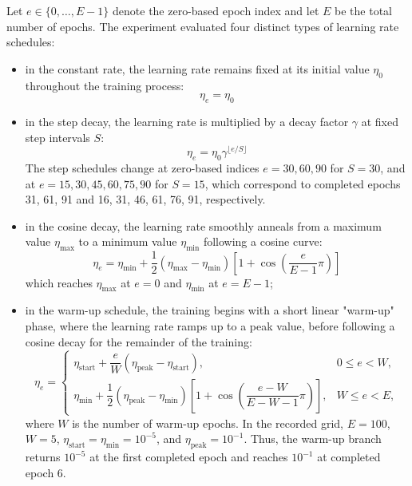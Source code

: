Let $e\in\{0,\ldots,E-1\}$ denote the zero-based epoch index and let $E$ be the total number of epochs. The experiment evaluated four distinct types of learning rate schedules:
\begin{itemize}
    \item[-] in the constant rate, the learning rate remains fixed at its initial value $\eta_0$ throughout the training process:
    \begin{equation*}
    \eta_e=\eta_0
    \end{equation*}
    \item[-] in the step decay, the learning rate is multiplied by a decay factor $\gamma$ at fixed step intervals $S$:
    \begin{equation*}
    \eta_e=\eta_0\gamma^{\lfloor e/S\rfloor}
    \end{equation*}
    The step schedules change at zero-based indices $e=30,60,90$ for $S=30$, and at $e=15,30,45,60,75,90$ for $S=15$, which correspond to completed epochs 31, 61, 91 and 16, 31, 46, 61, 76, 91, respectively.
    \item[-] in the cosine decay, the learning rate smoothly anneals from a maximum value $\eta_{\max}$ to a minimum value $\eta_{\min}$ following a cosine curve:
    \begin{equation*}
    \eta_e=\eta_{\min}+\frac{1}{2}(\eta_{\max}-\eta_{\min})
    \left[1+\cos\left(\frac{e}{E-1}\pi\right)\right]
    \end{equation*}
    which reaches $\eta_{\max}$ at $e=0$ and $\eta_{\min}$ at $e=E-1$;
    \item[-] in the warm-up schedule, the training begins with a short linear "warm-up" phase, where the learning rate ramps up to a peak value, before following a cosine decay for the remainder of the training:
    \begin{equation*}
    \eta_e=\begin{cases}
        \eta_{\mathrm{start}}+\dfrac{e}{W}
        (\eta_{\mathrm{peak}}-\eta_{\mathrm{start}}), & 0\leq e<W,\\[6pt]
        \eta_{\min}+\dfrac{1}{2}(\eta_{\mathrm{peak}}-\eta_{\min})
        \left[1+\cos\left(\dfrac{e-W}{E-W-1}\pi\right)\right], & W\leq e<E,
    \end{cases}
    \end{equation*}
    where $W$ is the number of warm-up epochs. In the recorded grid, $E=100$, $W=5$, $\eta_{\mathrm{start}}=\eta_{\min}=10^{-5}$, and $\eta_{\mathrm{peak}}=10^{-1}$. Thus, the warm-up branch returns $10^{-5}$ at the first completed epoch and reaches $10^{-1}$ at completed epoch 6.
\end{itemize}
\vspace{2ex}

